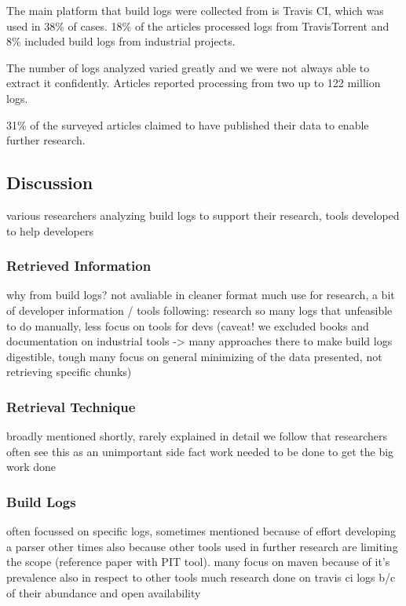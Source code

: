 The main platform that build logs were collected from is Travis
CI, %
which was used in 38\% of cases.
18\% of the articles processed logs from TravisTorrent and 8\% included
build logs from industrial projects.

The number of logs analyzed varied greatly and we were not always able to
extract it confidently.
Articles reported processing from two up to 122 million logs.

31\% of the surveyed articles claimed to have published their data to
enable further research.

\subsection{Discussion}
various researchers analyzing build logs to support their research,
tools developed to help developers %

\subsubsection{Retrieved Information}
why from build logs? not avaliable in cleaner format much use for
research, a bit of developer information / tools following: research
so many logs that unfeasible to do manually, less focus on tools for
devs (caveat! we excluded books and documentation on industrial tools
-> many approaches there to make build logs digestible, tough many
focus on general minimizing of the data presented, not retrieving
specific chunks)

\subsubsection{Retrieval Technique}
broadly mentioned shortly, rarely explained in detail we follow that
researchers often see this as an unimportant side fact work needed to
be done to get the big work done

\subsubsection{Build Logs}
often focussed on specific logs, sometimes mentioned because of effort
developing a parser other times also because other tools used in
further research are limiting the scope (reference paper with PIT
tool).
many focus on maven because of it's prevalence also in respect
to other tools much research done on travis ci logs b/c of their
abundance and open availability

